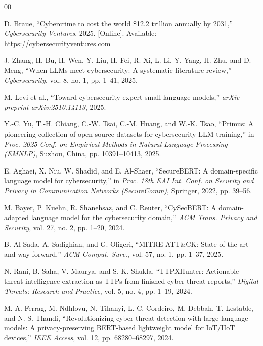 \documentclass[conference]{IEEEtran}
\begin{document}
\begin{thebibliography}{00}
\scriptsize
\setlength{\itemsep}{0pt}
\setlength{\parskip}{0pt}

D. Braue,
``Cybercrime to cost the world \$12.2 trillion annually by 2031,''
\textit{Cybersecurity Ventures}, 2025.
[Online]. Available: \url{https://cybersecurityventures.com}

J. Zhang, H. Bu, H. Wen, Y. Liu, H. Fei, R. Xi, L. Li, Y. Yang,
H. Zhu, and D. Meng,
``When LLMs meet cybersecurity: A systematic literature review,''
\textit{Cybersecurity}, vol. 8, no. 1, pp. 1--41, 2025.

M. Levi et al.,
``Toward cybersecurity-expert small language models,''
\textit{arXiv preprint arXiv:2510.14113}, 2025.

Y.-C. Yu, T.-H. Chiang, C.-W. Tsai, C.-M. Huang, and W.-K. Tsao,
``Primus: A pioneering collection of open-source datasets for
cybersecurity LLM training,''
in \textit{Proc. 2025 Conf. on Empirical Methods in Natural Language
Processing (EMNLP)},
Suzhou, China, pp. 10391--10413, 2025.

E. Aghaei, X. Niu, W. Shadid, and E. Al-Shaer,
``SecureBERT: A domain-specific language model for cybersecurity,''
in \textit{Proc. 18th EAI Int. Conf. on Security and Privacy in
Communication Networks (SecureComm)},
Springer, 2022, pp. 39--56.

M. Bayer, P. Kuehn, R. Shanehsaz, and C. Reuter,
``CySecBERT: A domain-adapted language model for the cybersecurity
domain,''
\textit{ACM Trans. Privacy and Security}, vol. 27, no. 2,
pp. 1--20, 2024.

B. Al-Sada, A. Sadighian, and G. Oligeri,
``MITRE ATT\&CK: State of the art and way forward,''
\textit{ACM Comput. Surv.}, vol. 57, no. 1, pp. 1--37, 2025.

N. Rani, B. Saha, V. Maurya, and S. K. Shukla,
``TTPXHunter: Actionable threat intelligence extraction as TTPs
from finished cyber threat reports,''
\textit{Digital Threats: Research and Practice}, vol. 5, no. 4,
pp. 1--19, 2024.

M. A. Ferrag, M. Ndhlovu, N. Tihanyi, L. C. Cordeiro, M. Debbah,
T. Lestable, and N. S. Thandi,
``Revolutionizing cyber threat detection with large language models:
A privacy-preserving BERT-based lightweight model for IoT/IIoT
devices,''
\textit{IEEE Access}, vol. 12, pp. 68280--68297, 2024.


\end{thebibliography}
\end{document}
